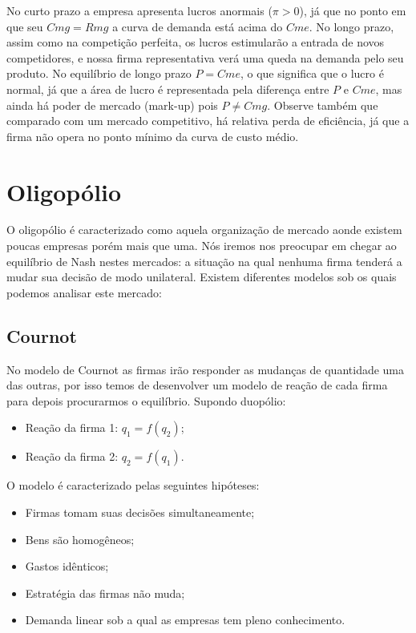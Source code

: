 \documentclass[12pt,a4paper,oneside,brazil]{abntex2}
\begin{document}
No curto prazo a empresa apresenta lucros anormais ($\pi > 0$), já que no ponto em que seu $Cmg = Rmg$  a curva de demanda está acima do $Cme$. No longo prazo, assim como na competição perfeita, os lucros estimularão a entrada de novos competidores, e nossa firma representativa verá uma queda na demanda pelo seu produto. No equilíbrio de longo prazo $P = Cme$, o que significa que o lucro é normal, já que a área de lucro é representada pela diferença entre $P$ e $Cme$, mas ainda há poder de mercado (mark-up) pois $ P \neq Cmg$. Observe também que comparado com um mercado competitivo, há relativa perda de eficiência, já que a firma não opera no ponto mínimo da curva de custo médio.

\chapter{Oligopólio}
O oligopólio é caracterizado como aquela organização de mercado aonde existem poucas empresas porém mais que uma. Nós iremos nos preocupar em chegar ao equilíbrio de Nash nestes mercados: a situação na qual nenhuma firma tenderá a mudar sua decisão de modo unilateral. Existem diferentes modelos sob os quais podemos analisar este mercado:

\section{Cournot}
No modelo de Cournot as firmas irão responder as mudanças de quantidade uma das outras, por isso temos de desenvolver um modelo de reação de cada firma para depois procurarmos o equilíbrio. Supondo duopólio:

\begin{itemize}
\item Reação da firma 1: $q_1 = f(q_2)$;
\item Reação da firma 2: $q_2 = f(q_1)$.
\end{itemize}

O modelo é caracterizado pelas seguintes hipóteses:
\begin{itemize}
\item Firmas tomam suas decisões simultaneamente; 
\item Bens são homogêneos;
\item Gastos idênticos;
\item Estratégia das firmas não muda;
\item Demanda linear sob a qual as empresas tem pleno conhecimento.
\end{itemize}
\end{document}
